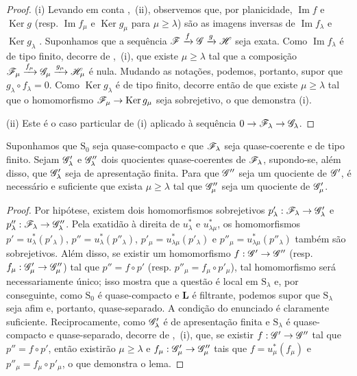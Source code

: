 \begin{proof}
(i) Levando em conta ,~(ii), observemos que, por planicidade, $\operatorname{Im} f$ e $\operatorname{Ker} g$ (resp. $\operatorname{Im} f_\mu$ e $\operatorname{Ker} g_\mu$ para $\mu\geqslant\lambda$) são as imagens inversas de $\operatorname{Im} f_\lambda$ e $\operatorname{Ker} g_\lambda$ . Suponhamos que a sequência $\mathscr{F}\xrightarrow{f}\mathscr{G}\xrightarrow{g}\mathscr{H}$ seja exata. Como $\operatorname{Im} f_\lambda$ é de tipo finito, decorre de ,~(i), que existe $\mu\geqslant\lambda$ tal que a composição $\mathscr{F}_\mu\xrightarrow{f_\mu}\mathscr{G}_\mu\xrightarrow{g_\mu}\mathscr{H}_\mu$ é nula. Mudando as notações, podemos, portanto, supor que $g_\lambda\circ f_\lambda=0$. Como $\operatorname{Ker} g_\lambda$ é de tipo finito, decorre então de  que existe $\mu\geqslant\lambda$ tal que o homomorfismo $\sh{F}_\mu\to\operatorname{Ker} g_\mu$ seja sobrejetivo, o que demonstra (i).

(ii) Este é o caso particular de (i) aplicado à sequência $0\to\sh{F}_\lambda\to\sh{G}_\lambda$.
\end{proof}

\begin{lemma}[8.5.9]
\label{IV.8.5.9}
Suponhamos que $\mathrm{S}_0$ seja quase-compacto e que $\mathscr{F}_\lambda$ seja quase-coerente e de tipo finito. Sejam $\mathscr{G}'_\lambda$ e $\mathscr{G}''_\lambda$ dois quocientes quase-coerentes de $\mathscr{F}_\lambda$, supondo-se, além disso, que $\mathscr{G}'_\lambda$ seja de apresentação finita. Para que $\mathscr{G}''$ seja um quociente de $\mathscr{G}'$, é necessário e suficiente que exista $\mu\geqslant\lambda$ tal que $\mathscr{G}''_\mu$ seja um quociente de $\mathscr{G}'_\mu$.
\end{lemma}

\begin{proof}
Por hipótese, existem dois homomorfismos sobrejetivos $p'_\lambda:\sh{F}_\lambda\to\sh{G}'_\lambda$ e $p''_\lambda:\sh{F}_\lambda\to\sh{G}''_\lambda$. Pela exatidão à direita de $u_\lambda^*$ e $u_{\lambda\mu}^*$, os homomorfismos $p'=u_\lambda^*(p'_\lambda)$, $p''=u_\lambda^*(p''_\lambda)$, $p'_\mu=u_{\lambda\mu}^*(p'_\lambda)$ e $p''_\mu=u_{\lambda\mu}^*(p''_\lambda)$ também são sobrejetivos. Além disso, se existir um homomorfismo $f:\sh{G}'\to\sh{G}''$ (resp. $f_\mu:\sh{G}'_\mu\to\sh{G}''_\mu$) tal que $p''=f\circ p'$ (resp. $p''_\mu=f_\mu\circ p'_\mu$), tal homomorfismo será necessariamente único; isso mostra que a questão é local em $\mathrm{S}_\lambda$ e, por conseguinte, como $\mathrm{S}_0$ é quase-compacto e $\mathbf{L}$ é filtrante, podemos supor que $\mathrm{S}_\lambda$ seja afim e, portanto, quase-separado. A condição do enunciado é claramente suficiente. Reciprocamente, como $\mathscr{G}'_\lambda$ é de apresentação finita e $\mathrm{S}_\lambda$ é quase-compacto e quase-separado, decorre de ,~(i), que, se existir $f:\sh{G}'\to\sh{G}''$ tal que $p''=f\circ p'$, então existirão $\mu\geqslant\lambda$ e $f_\mu:\sh{G}'_\mu\to\sh{G}''_\mu$ tais que $f=u_\mu^*(f_\mu)$ e $p''_\mu=f_\mu\circ p'_\mu$, o que demonstra o lema.
\end{proof}

